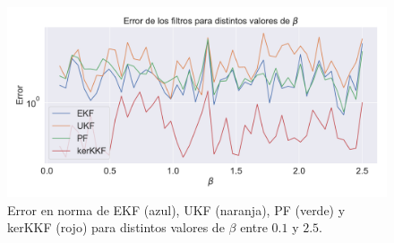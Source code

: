 \begin{figure}[h]
    \centering
    \includegraphics[width=0.8\linewidth]{img/content/chapter4/nonlinear_filters_sir_error_beta.pdf}
    \caption{Error en norma de EKF (azul), UKF (naranja), PF (verde) y kerKKF (rojo) para distintos valores de $\beta$ entre $0.1$ y $2.5$.}
    \label{fig:nonlinear_filters_sir_error_beta}
\end{figure}

